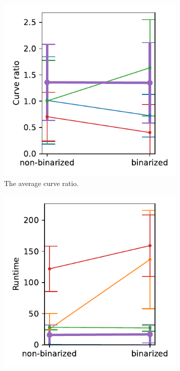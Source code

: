 \begin{figure}[h]
\begin{subfigure}{.3\textwidth}
    \includegraphics[width=\textwidth]{graphics/eval/curve ratio_binarization_sketchbench.pdf}
    \caption{The average curve ratio.}
\end{subfigure}
    \begin{subfigure}{.3\textwidth}
    \centering
    \includegraphics[width=\textwidth]{graphics/eval/runtime_binarization_sketchbench.pdf}

\end{subfigure}
\end{figure}
